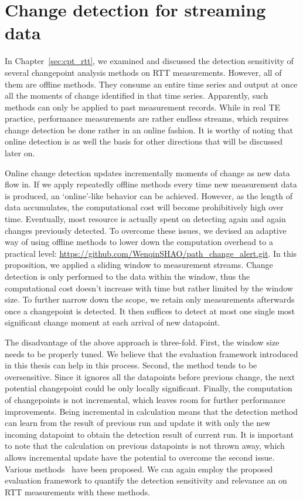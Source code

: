 \section{Change detection for streaming data}
In Chapter~\ref{sec:cpt_rtt}, we examined and discussed the detection sensitivity of several changepoint analysis methods on RTT measurements. However, all of them are offline methods. They consume an entire time series and output at once all the moments of change identified in that time series.
Apparently, such methods can only be applied to past measurement records. 
While in real TE practice, performance measurements are rather endless streams, which requires change detection be done rather in an online fashion. It is worthy of noting that online detection is as well the basis for other directions that will be discussed later on.

Online change detection updates incrementally moments of change as new data flow in.
If we apply repeatedly offline methods every time new measurement data is produced, an `online'-like behavior can be achieved. However, as the length of data accumulates, the computational cost will become prohibitively high over time. Eventually, most resource is actually spent on detecting again and again changes previously detected.
To overcome these issues, we devised an adaptive way of using offline methods to lower down the computation overhead to a practical level: \url{https://github.com/WenqinSHAO/path_change_alert.git}. 
In this proposition, we applied a sliding window to measurement streams. Change detection is only performed to the data within the window, thus the computational cost doesn't increase with time but rather limited by the window size. To further narrow down the scope, we retain only measurements afterwards once a changepoint is detected. It then suffices to detect at most one single most significant change moment at each arrival of new datapoint.

The disadvantage of the above approach is three-fold. First, the window size needs to be properly tuned. We believe that the evaluation framework introduced in this thesis can help in this process. Second, the method tends to be oversensitive. Since it ignores all the datapoints before previous change, the next potential changepoint could be only locally significant. Finally, the computation of changepoints is not incremental, which leaves room for further performance improvements. Being incremental in calculation means that the detection method can learn from the result of previous run and update it with only the new incoming datapoint to obtain the detection result of current run. 
It is important to note that the calculation on previous datapoints is not thrown away, which allows incremental update have the potential to overcome the second issue.
Various methods~\cite{Caron2012,Turner2009a,Sharkey2014,Ho2014,Adams2007,Conditions2015} have been proposed. We can again employ the proposed evaluation framework to quantify the detection sensitivity and relevance an on RTT measurements with these methods.

